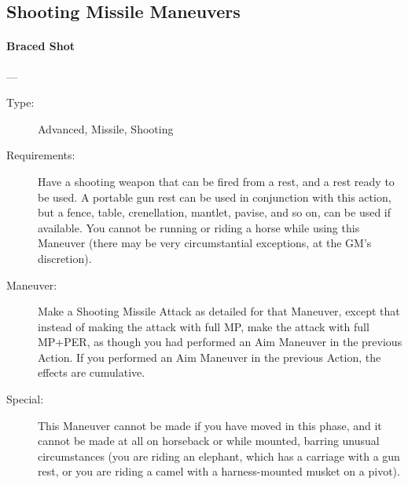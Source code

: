 \documentclass[oneside,11pt,english]{book}
\begin{document}
\subsection{Shooting Missile Maneuvers}
\paragraph{\large\label{man:Braced Shot}Braced Shot}---\quad{\large[???????]}
\vspace{-10pt}\begin{description} 
\item [Type:] Advanced, Missile, Shooting 
\item [Requirements:] Have a shooting weapon that can be fired from a rest, and a rest ready to be used. A 
  portable gun rest can be used in conjunction with this action, but a fence, table, crenellation, mantlet, 
  pavise, and so on, can be used if available. You cannot be running or riding a horse while using this 
  Maneuver (there may be very circumstantial exceptions, at the GM’s discretion). 
\item [Maneuver:] Make a Shooting Missile Attack as detailed for that Maneuver, except that instead of making 
  the attack with full MP, make the attack with full MP+PER, as though you had performed an Aim 
  Maneuver in the previous Action. If you performed an Aim Maneuver in the previous Action, the effects 
  are cumulative. 
\item [Special:] This Maneuver cannot be made if you have moved in this phase, and it cannot be made at all on 
  horseback or while mounted, barring unusual circumstances (you are riding an elephant, which has a 
  carriage with a gun rest, or you are riding a camel with a harness-mounted musket on a pivot). 
\end{description}
\end{document}
